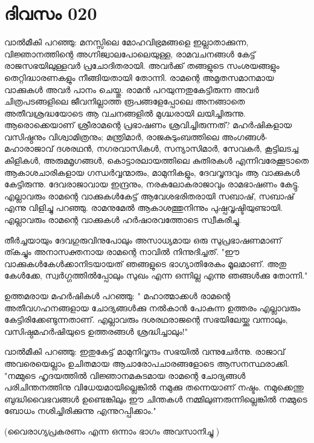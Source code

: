  
\section{ദിവസം 020}


വാല്‍മീകി പറഞ്ഞു: മനസ്സിലെ മോഹവിഭ്രമങ്ങളെ ഇല്ലാതാക്കുന്ന, വിജ്ഞാനത്തിന്റെ അഗ്നിജ്വാലപോലെയുള്ള, രാമവചനങ്ങള്‍ കേട്ട്‌ രാജസഭയിലുള്ളവര്‍ പ്രചോദിതരായി. അവര്‍ക്ക്‌ തങ്ങളുടെ സംശയങ്ങളും തെറ്റിദ്ധാരണകളും നീങ്ങിയതായി തോന്നി. രാമന്റെ അമൃതസമാനമായ വാക്കുകള്‍ അവര്‍ പാനം ചെയ്തു. രാമന്‍ പറയുന്നതുകേട്ടിരുന്ന അവര്‍ ചിത്രപടങ്ങളിലെ ജീവനില്ലാത്ത രൂപങ്ങളേപ്പോലെ അനങ്ങാതെ അതീവശ്രദ്ധയോടെ ആ വചനങ്ങളില്‍ മുഗ്ദ്ധരായി ലയിച്ചിരുന്നു. ആരൊക്കെയാണ്‌ ശ്രീരാമന്റെ പ്രഭാഷണം ശ്രവിച്ചിരുന്നത്‌? മഹര്‍ഷികളായ വസിഷ്ഠനും വിശ്വാമിത്രനും; മന്ത്രിമാര്‍, രാജകുടുംബത്തിലെ അംഗങ്ങള്‍- മഹാരാജാവ്‌ ദശരഥന്‍, നഗരവാസികള്‍, സന്യാസിമാര്‍, സേവകര്‍, കൂട്ടിലടച്ച കിളികള്‍, അരുമമൃഗങ്ങള്‍, കൊട്ടാരലായത്തിലെ കുതിരകള്‍ എന്നിവരേക്കൂടാതെ ആകാശചാരികളായ ഗന്ധര്‍വ്വന്മാരും, മാമുനികളും, ദേവവൃന്ദവും ആ വാക്കുകള്‍ കേട്ടിരുന്നു. ദേവരാജാവായ ഇന്ദ്രനും, നരകലോകരാജാവും രാമഭാഷണം കേട്ടു. എല്ലാവരും രാമന്റെ വാക്കുകള്‍കേട്ട്‌ ആവേശഭരിതരായി സബാഷ്‌, സബാഷ്‌ എന്നു വിളിച്ചു പറഞ്ഞു. രാമനുമേല്‍ ആകാശത്തുനിന്നും പുഷ്പവൃഷ്ടിയുണ്ടായി. എല്ലാവരും രാമന്റെ വാക്കുകള്‍ ഹര്‍ഷാരവത്തോടെ സ്വീകരിച്ചു.

തീര്‍ച്ചയായും ദേവഗുരുവിനുപോലും അസാധ്യമായ ഒരു സുപ്രഭാഷണമാണ്‌ ത്കച്ചും അനാസക്തനായ രാമന്റെ നാവില്‍ നിന്നുദിച്ചത്‌. "ഈ വാക്കുകള്‍കേള്‍ക്കാനിടയായത്‌ ഞങ്ങളുടെ ഭാഗ്യാതിരേകം മൂലമാണ്‌. അതു കേള്‍ക്കേ, സ്വര്‍ഗ്ഗത്തില്‍പ്പോലും സുഖം എന്ന ഒന്നില്ല എന്നു ഞങ്ങള്‍ക്കു തോന്നി."

ഉത്തമരായ മഹര്‍ഷികള്‍ പറഞ്ഞു: " മഹാത്മാക്കള്‍ രാമന്റെ അതീവഗഹനങ്ങളായ ചോദ്യങ്ങള്‍ക്കു നല്‍കാന്‍ പോകുന്ന ഉത്തരം എല്ലാവരും കേട്ടിരിക്കേണ്ടുന്നതാണ്‌. എല്ലാവരും ദശരഥരാജന്റെ സഭയിലേയ്ക്കു വന്നാലും, വസിഷ്ഠമഹര്‍ഷിയുടെ ഉത്തരങ്ങള്‍ ശ്രദ്ധിച്ചാലും!"

വാല്‍മീകി പറഞ്ഞു: ഇതുകേട്ട്‌ മാമുനിവൃന്ദം സഭയില്‍ വന്നുചേര്‍ന്നു. രാജാവ്‌ അവരെയെല്ലാം ഉചിതമായ ആചാരോപചാരങ്ങളോടെ ആസനസ്ഥരാക്കി. "നമ്മുടെ ഹൃദയത്തില്‍ വിജ്ഞാനമകുടമായ രാമന്റെ ചോദ്യങ്ങള്‍ പരിചിന്തനത്തിനു വിധേയമായില്ലെങ്കില്‍ നമുക്കു തന്നെയാണ്‌ നഷ്ടം. നമുക്കെന്തു ബുദ്ധിവൈഭവങ്ങള്‍ ഉണ്ടെങ്കിലും ഈ ചിന്തകള്‍ നമ്മിലുണരുന്നില്ലെങ്കില്‍ നമ്മുടെ ബോധം നശിച്ചിരിക്കുന്നു എന്നുറപ്പിക്കാം."

(വൈരാഗ്യപ്രകരണം എന്ന ഒന്നാം  ഭാഗം അവസാനിച്ചു )

